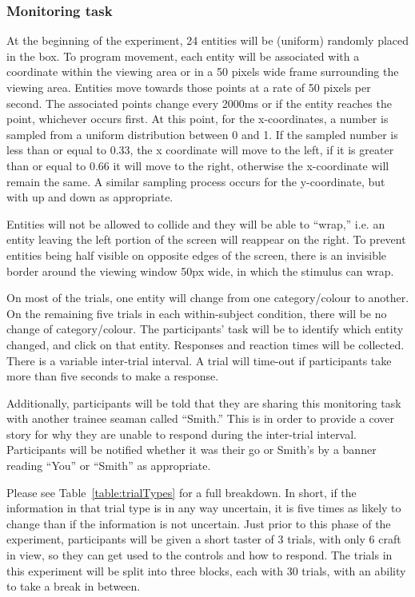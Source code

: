 \documentclass[doc, a4paper, apacite]{apa6}
\begin{document}
\subsubsection{Monitoring task}
At the beginning of the experiment, 24 entities will be (uniform) randomly placed in the box. 
To program movement, each entity will be associated with a coordinate within the viewing area or in a 50 pixels wide frame surrounding the viewing area. 
Entities move towards those points at a rate of 50 pixels per second.
The associated points change every 2000ms or if the entity reaches the point, whichever occurs first. 
At this point, for the x-coordinates, a number is sampled from a uniform distribution between 0 and 1.
If the sampled number is less than or equal to 0.33, the x coordinate will move to the left, if it is greater than or equal to 0.66 it will move to the right, otherwise the x-coordinate will remain the same. 
A similar sampling process occurs for the y-coordinate, but with up and down as appropriate. 

Entities will not be allowed to collide and they will be able to ``wrap,'' i.e. an entity leaving the left portion of the screen will reappear on the right.
To prevent entities being half visible on opposite edges of the screen, there is an invisible border around the viewing window 50px wide, in which the stimulus can wrap. 

On most of the trials, one entity will change from one category/colour to another. 
On the remaining five trials in each within-subject condition, there will be no change of category/colour. 
The participants' task will be to identify which entity changed, and click on that entity. 
Responses and reaction times will be collected. 
There is a variable inter-trial interval. 
A trial will time-out if participants take more than five seconds to make a response. 

Additionally, participants will be told that they are sharing this monitoring task with another trainee seaman called ``Smith.'' 
This is in order to provide a cover story for why they are unable to respond during the inter-trial interval. 
Participants will be notified whether it was their go or Smith's by a banner reading ``You'' or ``Smith'' as appropriate. 

Please see Table~\ref{table:trialTypes} for a full breakdown. 
In short, if the information in that trial type is in any way uncertain, it is five times as likely to change than if the information is not uncertain. 
Just prior to this phase of the experiment, participants will be given a short taster of 3 trials, with only 6 craft in view, so they can get used to the controls and how to respond. 
The trials in this experiment will be split into three blocks, each with 30 trials, with an ability to take a break in between. 
\end{document}
